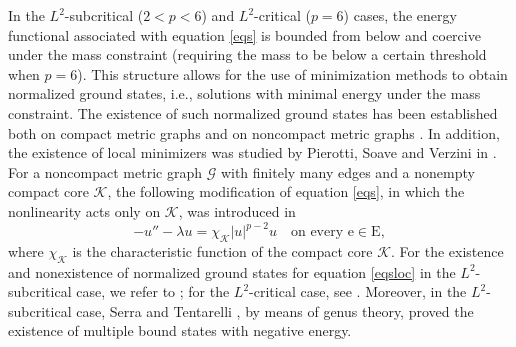 \documentclass[11pt]{amsart}
\newcommand{\abs}[1]{\lvert#1\rvert}
\newcommand{\G}{\mathcal{G}}
\newcommand{\K}{\mathcal{K}}
\newcommand{\E}{\mathrm{E}}
\newcommand{\e}{\mathrm{e}}
\numberwithin{equation}{section}
\begin{document}
In the $L^2$-subcritical ($2<p<6$) and $L^2$-critical ($p=6$) cases, the energy functional associated with equation \eqref{eqs} is bounded from below and coercive under the mass constraint (requiring the mass to be below a certain threshold when $p=6$). This structure allows for the use of minimization methods to obtain normalized ground states, i.e., solutions with minimal energy under the mass constraint. The existence of such normalized ground states has been established both on compact metric graphs \cite{CDS, Do} and on noncompact metric graphs \cite{ABD, ACFN, AST, AST2, AST3, Do1, NP, PS}. In addition, the existence of local minimizers was studied by Pierotti, Soave and Verzini in \cite{PSV}. For a noncompact metric graph $\G$ with finitely many edges and a nonempty compact core $\K$, the following modification of equation \eqref{eqs}, in which the nonlinearity acts only on $\K$, was introduced in \cite{Gn,No}
\begin{equation}
\label{eqsloc}
    -u'' - \lambda u= \chi_\K\abs{u}^{p-2}u \quad \text{on every } \e \in \E,
\end{equation}
where $\chi_\K$ is the characteristic function of the compact core $\K$. For the existence and nonexistence of normalized ground states for equation \eqref{eqsloc} in the $L^2$-subcritical case, we refer to \cite{ST, T}; for the $L^2$-critical case, see \cite{DT, DT2}. Moreover, in the $L^2$-subcritical case, Serra and Tentarelli \cite{ST1}, by means of genus theory, proved the existence of multiple bound states with negative energy. 
\end{document}
